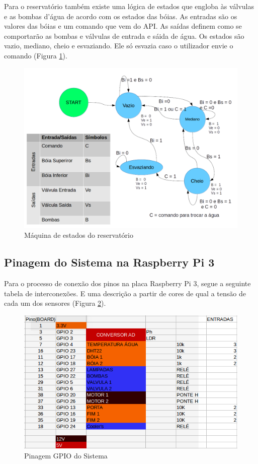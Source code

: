 Para o reservatório também existe uma lógica de estados que engloba às válvulas e as bombas d'água de acordo com os estados das bóias. As entradas são os valores das bóias e um comando que vem do API. As saídas definem como se comportarão as bombas e válvulas de entrada e sáida de água. Os estados são vazio, mediano, cheio e esvaziando. Ele só esvazia caso o utilizador envie o comando (Figura \ref{maquina_reservatorio}).

\begin{figure}[!htb]
	\centering
	\includegraphics[scale=0.35]{figuras/ControleReservatorio.png} 
	\caption{Máquina de estados do reservatório}
	\label{maquina_reservatorio}
\end{figure} 

\subsection{Pinagem do Sistema na Raspberry Pi 3}

Para o processo de conexão dos pinos na placa Raspberry Pi 3, segue a seguinte tabela de interconexões. E uma descrição a partir de cores de qual a tensão de cada um dos sensores (Figura \ref{pinagem}).


\begin{figure}[!htb]
	\centering
	\includegraphics[scale=0.60]{figuras/Pinagem.png} 
	\caption{Pinagem GPIO do Sistema}
	\label{pinagem}
\end{figure} 


